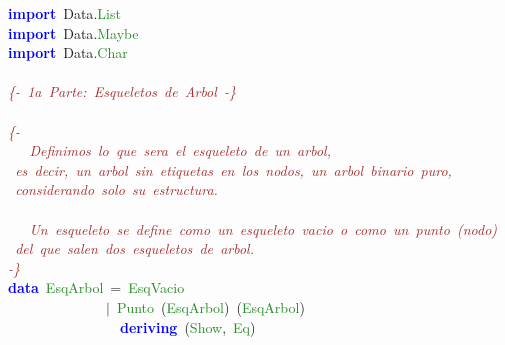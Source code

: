 
\begin{allintypewriter}
 



\noindent
\mbox{}\textbf{\textcolor{Blue}{import}}\ Data\textcolor{BrickRed}{.}\textcolor{ForestGreen}{List} \\
\mbox{}\textbf{\textcolor{Blue}{import}}\ Data\textcolor{BrickRed}{.}\textcolor{ForestGreen}{Maybe} \\
\mbox{}\textbf{\textcolor{Blue}{import}}\ Data\textcolor{BrickRed}{.}\textcolor{ForestGreen}{Char} \\
\mbox{} \\
\mbox{}\textit{\textcolor{Brown}{\{-\ 1a\ Parte:\ Esqueletos\ de\ Arbol\ -\}}} \\
\mbox{} \\
\mbox{}\textit{\textcolor{Brown}{\{-\ }} \\
\mbox{}\textit{\textcolor{Brown}{\ \ \ Definimos\ lo\ que\ sera\ el\ esqueleto\ de\ un\ arbol,\ }} \\
\mbox{}\textit{\textcolor{Brown}{\ es\ decir,\ un\ arbol\ sin\ etiquetas\ en\ los\ nodos,\ un\ arbol\ binario\ puro,}} \\
\mbox{}\textit{\textcolor{Brown}{\ considerando\ solo\ su\ estructura.}} \\
\mbox{} \\
\mbox{}\textit{\textcolor{Brown}{\ \ \ Un\ esqueleto\ se\ define\ como\ un\ esqueleto\ vacio\ o\ como\ un\ punto\ (nodo)}} \\
\mbox{}\textit{\textcolor{Brown}{\ del\ que\ salen\ dos\ esqueletos\ de\ arbol.}} \\
\mbox{}\textit{\textcolor{Brown}{-\}}} \\
\mbox{}\textbf{\textcolor{Blue}{data}}\ \textcolor{ForestGreen}{EsqArbol}\ \textcolor{BrickRed}{=}\ \textcolor{ForestGreen}{EsqVacio} \\
\mbox{}\ \ \ \ \ \ \ \ \ \ \ \ \ \ \textcolor{BrickRed}{$|$}\ \textcolor{ForestGreen}{Punto}\ \textcolor{BrickRed}{(}\textcolor{ForestGreen}{EsqArbol}\textcolor{BrickRed}{)}\ \textcolor{BrickRed}{(}\textcolor{ForestGreen}{EsqArbol}\textcolor{BrickRed}{)} \\
\mbox{}\ \ \ \ \ \ \ \ \ \ \ \ \ \ \ \ \textbf{\textcolor{Blue}{deriving}}\ \textcolor{BrickRed}{(}\textcolor{ForestGreen}{Show}\textcolor{BrickRed}{,}\ \textcolor{ForestGreen}{Eq}\textcolor{BrickRed}{)} \\
\mbox{} \\

\end{allintypewriter}
